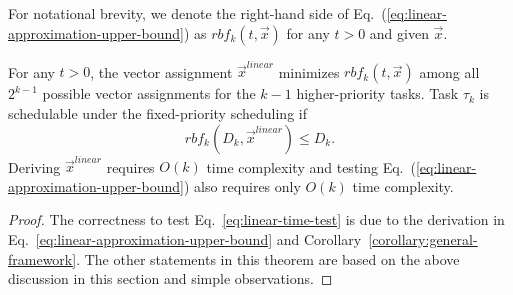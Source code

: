 For notational brevity, we denote the right-hand side of
Eq.~(\ref{eq:linear-approximation-upper-bound}) as $rbf_k(t, \vec{x})$
for any $t > 0$ and given $\vec{x}$.
\begin{theorem}
\label{theorem:linear-time-test}
  For any $t > 0$, the vector assignment $\vec{x}^{linear}$ minimizes
  $rbf_k(t, \vec{x})$ among all $2^{k-1}$ possible vector assignments
  for the $k-1$ higher-priority tasks. Task $\tau_k$ is schedulable
  under the fixed-priority scheduling if
  \begin{equation}
    \label{eq:linear-time-test}
    rbf_k(D_k, \vec{x}^{linear}) \leq D_k.
  \end{equation}
  Deriving $\vec{x}^{linear}$ requires $O(k)$ time complexity and
  testing Eq.~(\ref{eq:linear-approximation-upper-bound}) also
  requires only $O(k)$ time complexity.
\end{theorem}
\begin{proof}
  The correctness to test Eq.~\eqref{eq:linear-time-test} is due to
  the derivation in Eq.~\eqref{eq:linear-approximation-upper-bound}
  and Corollary~\ref{corollary:general-framework}. The other
  statements in this theorem are based on the above discussion in this
  section and simple observations.
\end{proof}


  
